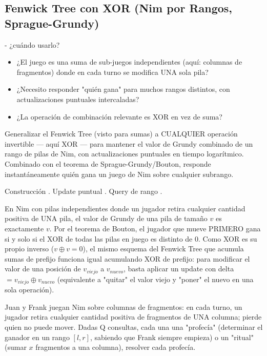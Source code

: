 \subsection{Fenwick Tree con XOR (Nim por Rangos, Sprague-Grundy)}

 - ¿cuándo usarlo?

\begin{itemize}
\item ¿El juego es una suma de sub-juegos independientes (aquí: columnas de fragmentos) donde en cada turno se modifica UNA sola pila?
\item ¿Necesito responder "quién gana" para muchos rangos distintos, con actualizaciones puntuales intercaladas?
\item ¿La operación de combinación relevante es XOR en vez de suma?
\end{itemize}

 Generalizar el Fenwick Tree (visto para sumas) a CUALQUIER operación invertible — aquí XOR — para mantener el valor de Grundy combinado de un rango de pilas de Nim, con actualizaciones puntuales en tiempo logarítmico. Combinado con el teorema de Sprague-Grundy/Bouton, responde instantáneamente quién gana un juego de Nim sobre cualquier subrango.

 Construcción . Update puntual . Query de rango .

 En Nim con pilas independientes donde un jugador retira cualquier cantidad positiva de UNA pila, el valor de Grundy de una pila de tamaño $v$ es exactamente $v$. Por el teorema de Bouton, el jugador que mueve PRIMERO gana si y solo si el XOR de todas las pilas en juego es distinto de 0. Como XOR es su propio inverso ($v \oplus v = 0$), el mismo esquema del Fenwick Tree que acumula sumas de prefijo funciona igual acumulando XOR de prefijo: para modificar el valor de una posición de $v_{viejo}$ a $v_{nuevo}$, basta aplicar un update con delta $= v_{viejo} \oplus v_{nuevo}$ (equivalente a "quitar" el valor viejo y "poner" el nuevo en una sola operación).


Juan y Frank juegan Nim sobre columnas de fragmentos: en cada turno, un jugador retira cualquier cantidad positiva de fragmentos de UNA columna; pierde quien no puede mover. Dadas Q consultas, cada una una "profecía" (determinar el ganador en un rango $[l,r]$, sabiendo que Frank siempre empieza) o un "ritual" (sumar $x$ fragmentos a una columna), resolver cada profecía.

